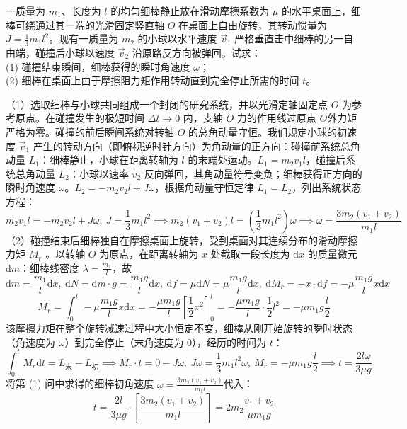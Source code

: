 \documentclass[lang=cn,11pt]{elegantbook}
\begin{document}
\begin{example}
一质量为 $m_1$、长度为 $l$ 的均匀细棒静止放在滑动摩擦系数为 $\mu$ 的水平桌面上，细棒可绕通过其一端的光滑固定竖直轴 $O$ 在桌面上自由旋转，其转动惯量为 $J = \frac{1}{3}m_1 l^2$。现有一质量为 $m_2$ 的小球以水平速度 $\vec{v}_1$ 严格垂直击中细棒的另一自由端，碰撞后小球以速度 $\vec{v}_2$ 沿原路反方向被弹回。试求：\\
(1) 碰撞结束瞬间，细棒获得的瞬时角速度 $\omega$；\\
(2) 细棒在桌面上由于摩擦阻力矩作用转动直到完全停止所需的时间 $t$。
\end{example}
\begin{solution}
（1）选取细棒与小球共同组成一个封闭的研究系统，并以光滑定轴固定点 $O$ 为参考原点。在碰撞发生的极短时间 $\Delta t \to 0$ 内，支轴 $O$ 力的作用线过原点 $O$外力矩严格为零。碰撞的前后瞬间系统对转轴 $O$ 的总角动量守恒。我们规定小球的初速度 $\vec{v}_1$ 产生的转动方向（即俯视逆时针方向）为角动量的正方向：碰撞前系统总角动量 $L_1$：细棒静止，小球在距离转轴为 $l$ 的末端处运动。$L_1 = m_2 v_1 l$，碰撞后系统总角动量 $L_2$：小球以速率 $v_2$ 反向弹回，其角动量符号变负；细棒获得正方向的瞬时角速度 $\omega$。$L_2 = -m_2 v_2 l + J\omega$，根据角动量守恒定律 $L_1 = L_2$，列出系统状态方程：$$m_2 v_1 l = -m_2 v_2 l + J\omega ,~J = \frac{1}{3}m_1 l^2\implies m_2 (v_1 + v_2) l = \left( \frac{1}{3}m_1 l^2 \right) \omega\implies\omega = \frac{3m_2 (v_1 + v_2)}{m_1 l}$$
（2）碰撞结束后细棒独自在摩擦桌面上旋转，受到桌面对其连续分布的滑动摩擦力矩 $M_r$ 。以转轴 $O$ 为原点，在距离转轴为 $x$ 处截取一段长度为 $\mathrm{d}x$ 的质量微元 $\mathrm{d}m$：细棒线密度 $\lambda = \frac{m_1}{l}$，故
\[\mathrm{d}m = \frac{m_1}{l}\mathrm{d}x,~\mathrm{d}N = \mathrm{d}m \cdot g = \frac{m_1 g}{l}\mathrm{d}x,~\mathrm{d}f = \mu \mathrm{d}N = \mu \frac{m_1 g}{l}\mathrm{d}x,~\mathrm{d}M_r = -x \cdot \mathrm{d}f = -\mu \frac{m_1 g}{l} x \mathrm{d}x\]
$$M_r = \int_{0}^{l} -\mu \frac{m_1 g}{l} x \mathrm{d}x = -\frac{\mu m_1 g}{l} \left[ \frac{1}{2}x^2 \right]_0^l = -\frac{\mu m_1 g}{l} \cdot \frac{1}{2}l^2 = -\mu m_1 g \frac{l}{2}$$
该摩擦力矩在整个旋转减速过程中大小恒定不变，细棒从刚开始旋转的瞬时状态（角速度为 $\omega$）到完全停止（末角速度为 0），经历的时间为 $t$：
$$\int_{0}^{t} M_r \mathrm{d}t = L_{\text{末}} - L_{\text{初}} \implies M_r \cdot t = 0 - J\omega,~J\omega = \frac{1}{3}m_1 l^2 \omega,~M_r=-\mu m_1 g \frac{l}{2}\implies t = \frac{2l\omega}{3\mu g}$$
将第 (1) 问中求得的细棒初角速度 $\omega = \frac{3m_2 (v_1 + v_2)}{m_1 l}$代入：$$t = \frac{2l}{3\mu g} \cdot \left[ \frac{3m_2 (v_1 + v_2)}{m_1 l} \right] = \boxed{2m_2 \frac{v_1 + v_2}{\mu m_1 g}}$$
\end{solution}
\end{document}
